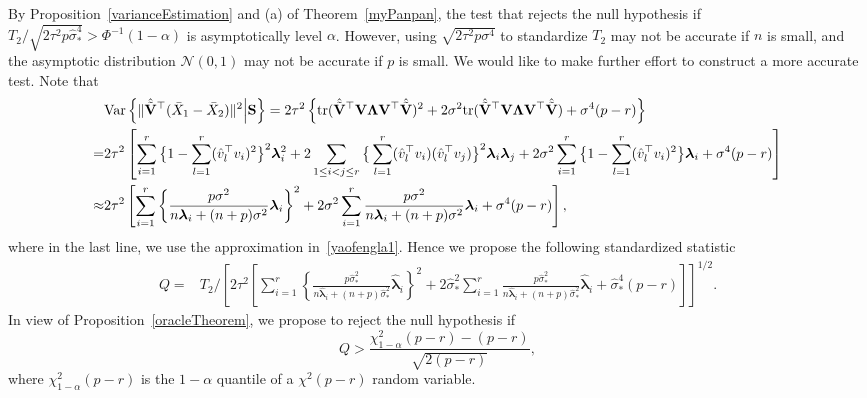 \documentclass[times,sort&compress,3p]{elsarticle}
\newcommand{\mytr}{ {\rm tr} }
\newcommand{\myVar}{ {\rm Var} }
\newcommand{\bfsym}[1]{\ensuremath{\boldsymbol{#1}}}
\def\blambda {\bfsym {\lambda}}        \def\bLambda {\bfsym {\Lambda}}
\theoremstyle{plain}
\theoremstyle{definition}
\theoremstyle{remark}
\begin{document}
By Proposition~\ref{varianceEstimation} and (a) of Theorem~\ref{myPanpan}, the test that rejects the null hypothesis if
$
T_2/\sqrt{2\tau^2 p\hat{\sigma}^4_*}>\Phi^{-1}(1-\alpha)
$
is asymptotically level $\alpha$.
However, using $\sqrt{2\tau^2 p\sigma^4}$ to standardize $T_2$ may not be accurate if $n$ is small, and the asymptotic distribution $\mathcal{N}(0,1)$ may not be accurate if $p$ is small.
We would like to make further effort to construct a more accurate test.
Note that
\begin{align*}
    &\myVar\left\{
\|\hat{\tilde{\BV}}^\top  (\bar{X}_1-\bar{X}_2)\|^2
\Big| \BS
\right\}
    =2\tau^2\left\{
\mytr(\hat{\tilde{\BV}}^\top  \BV \bLambda \BV^\top \hat{\tilde{\BV}})^2
+
2\sigma^2\mytr(\hat{\tilde{\BV}}^\top  \BV \bLambda \BV^\top \hat{\tilde{\BV}})
+\sigma^4 (p-r)
\right\}
\\
    =&
    2\tau^2\left[
        \sum_{i=1}^r \big\{1-\sum_{l=1}^r (\hat{v}_l^\top  v_i)^2\big\}^2 \blambda_i^2
        +2\sum_{1\leq i<j \leq r}\big\{\sum_{l=1}^r (\hat{v}_l^\top  v_i)(\hat{v}_l^\top  v_j )\big\}^2\blambda_i\blambda_j
    +
    2\sigma^2\sum_{i=1}^r \big\{ 1-\sum_{l=1}^r (\hat{v}_l^\top  v_i)^2\big\} \blambda_i
    +\sigma^4 (p-r)
\right]
    \\
    \approx&
    2\tau^2\left[
        \sum_{i=1}^r \left\{\frac{p\sigma^2}{n\blambda_i+(n+p)\sigma^2}\blambda_i\right\}^2
    +
    2\sigma^2\sum_{i=1}^r \frac{p\sigma^2}{n\blambda_i+(n+p)\sigma^2}\blambda_i
    +\sigma^4 (p-r)
\right],
\end{align*}
where in the last line, we use the approximation in~\eqref{yaofengla1}.
Hence we propose the following standardized statistic
$$
    \begin{aligned}
        Q=&T_2/
   \left[ 
        2\tau^2\left[
            \sum_{i=1}^r \left\{\frac{p\hat{\sigma}_*^2}{n\hat{\blambda}_i+(n+p)\hat{\sigma}_*^2}\hat{\blambda}_i\right\}^2
    +
        2\hat{\sigma}_*^2\sum_{i=1}^r \frac{p\hat{\sigma}_*^2}{n\hat{\blambda}_i+(n+p)\hat{\sigma}_*^2}\hat{\blambda}_i
        +\hat{\sigma}_*^4 (p-r)
\right]\right]^{1/2}.
    \end{aligned}
$$
In view of Proposition~\ref{oracleTheorem}, we propose to reject the null hypothesis if
$$
        Q>\frac{\chi^2_{1-\alpha}(p-r)-(p-r)}{\sqrt{2(p-r)}},
$$
where $\chi^2_{1-\alpha} (p-r)$ is the $1-\alpha$ quantile of a $\chi^2(p-r)$ random variable.
\end{document}
